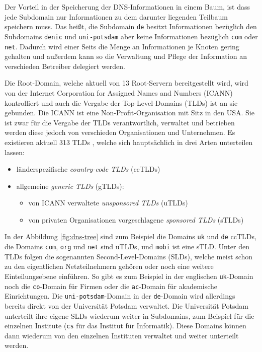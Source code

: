 \documentclass[a4paper, 12pt, BCOR10mm, DIV12, toc=bibliography, toc=listof, german]{scrbook}
\begin{document}
			Der Vorteil in der Speicherung der DNS-Informationen in einem Baum, ist dass jede Subdomain
			nur Informationen zu dem darunter liegenden Teilbaum speichern muss. Das heißt, die Subdomain
			\texttt{de} besitzt Informationen bezüglich den Subdomains \texttt{denic} und
			\texttt{uni-potsdam} aber keine Informationen bezüglich \texttt{com} oder \texttt{net}.
			Dadurch wird einer Seits die Menge an Informationen je Knoten gering gehalten und außerdem
			kann so die Verwaltung und Pflege der Information an verschieden Betreiber delegiert werden.

			Die Root-Domain, welche aktuell von 13 Root-Servern \cite{rootserver} bereitgestellt wird,
			wird von der Internet Corporation for Assigned Names and Numbers (ICANN) kontrolliert und auch
			die Vergabe der Top-Level-Domains (TLDs) ist an sie gebunden. Die ICANN ist eine
			Non-Profit-Organisation mit Sitz in den USA. Sie ist zwar für die Vergabe der TLDs
			verantwortlich, verwaltet und betrieben werden diese jedoch von verschieden Organisationen und
			Unternehmen. Es existieren aktuell 313 TLDs \cite{tlds}, welche sich hauptsächlich in drei
			Arten unterteilen lassen:

			\begin{itemize}
				\item länderspezifische \textit{country-code TLDs} (ccTLDs)
				\item allgemeine \textit{generic TLDs} (gTLDs):
				\begin{itemize}
					\item von ICANN verwaltete \textit{unsponsored TLDs} (uTLDs)
					\item von privaten Organisationen vorgeschlagene \textit{sponsored TLDs}
						(sTLDs)
				\end{itemize}
			\end{itemize}

			In der Abbildung \ref{fig:dns-tree} sind zum Beispiel die Domains \texttt{uk} und \texttt{de}
			ccTLDs, die Domains \texttt{com}, \texttt{org} und \texttt{net} sind uTLDs, und \texttt{mobi}
			ist eine sTLD. Unter den TLDs folgen die sogenannten Second-Level-Domains (SLDs), welche meist
			schon zu den eigentlichen Netzteilnehmern gehören oder noch eine weitere Einteilungsebene
			einführen. So gibt es zum Beispiel in der englischen \texttt{uk}-Domain noch die
			\texttt{co}-Domain für Firmen oder die \texttt{ac}-Domain für akademische Einrichtungen. Die
			\texttt{uni-potsdam}-Domain in der \texttt{de}-Domain wird allerdings bereits direkt von der
			Universität Potsdam verwaltet. Die Universität Potsdam unterteilt ihre eigene SLDs wiederum
			weiter in Subdomains, zum Beispiel für die einzelnen Institute (\texttt{cs} für das Institut
			für Informatik). Diese Domains können dann wiederum von den einzelnen Instituten verwaltet und
			weiter unterteilt werden.
\end{document}
